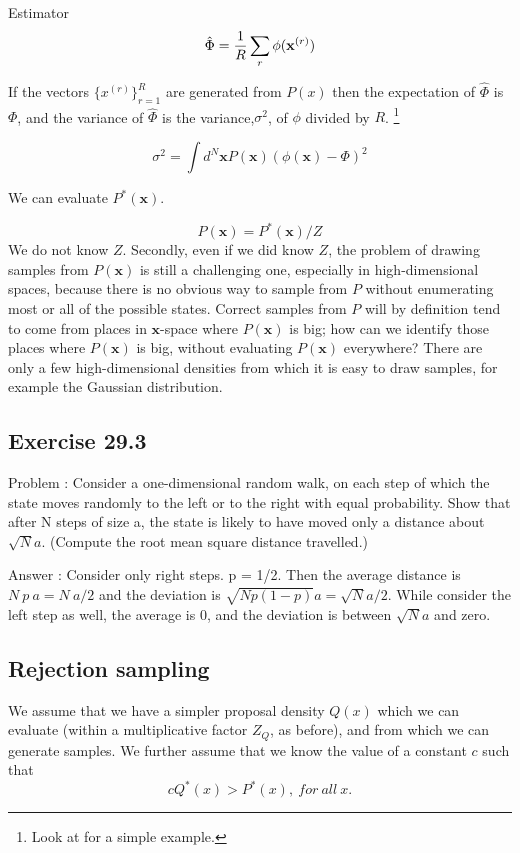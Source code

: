 \documentclass[a4paper,11pt]{article}
\newcommand{\vect}[1]{\boldsymbol{\mathbf{#1}}}
\numberwithin{equation}{section}
\begin{document}
{Estimator
$$
\hat \Phi = {1 \over R} \sum_r \phi(\vect x^{(r)})
$$

If the vectors $\{x^{(r)}\}^R_{r=1}$ are generated from $P(x)$ then the expectation of $\hat \Phi$ is $\Phi$, and the variance of $\hat \Phi$ is the variance,$\sigma^2$, of $\phi$ divided by $R$. \footnote{Look at \href{https://github.com/physhik/Study-of-David-Mackay-s-book-/blob/master/PopulationAndSampling.pdf}{\vect{this}} for a simple example.}

$$
\sigma^2 = \int d^N \vect x P(\vect x) (\phi(\vect x) - \Phi)^2
$$

We can evaluate $P^*(\vect x)$.

$$
P(\vect x)=P^*(\vect x)/Z
$$
We do not know $Z$. Secondly, even if we did know $Z$, the problem of drawing samples
from $P(\vect x)$ is still a challenging one, especially in high-dimensional spaces,
because there is no obvious way to sample from $P$ without enumerating most
or all of the possible states. Correct samples from $P$ will by definition tend
to come from places in $\vect x$-space where $P(\vect x)$ is big; how can we identify those
places where $P(\vect x)$ is big, without evaluating $P(\vect x)$ everywhere? There are only
a few high-dimensional densities from which it is easy to draw samples, for
example the Gaussian distribution.


\subsection{Exercise 29.3}

Problem : Consider a one-dimensional random walk, on each step of
which the state moves randomly to the left or to the right with equal
probability. Show that after N steps of size a, the state is likely to have
moved only a distance about $\sqrt{N}a$. (Compute the root mean square
distance travelled.)

Answer : Consider only right steps. p = 1/2. Then the average distance is $N~p~a = N~a/2$ and the deviation is $\sqrt{Np(1-p)}a = \sqrt{N}a/2$. While consider the left step as well, the average is 0, and the deviation is between $\sqrt{N}a$ and zero. 

\subsection{Rejection sampling}

We assume
that we have a simpler proposal density $Q(x)$ which we can evaluate (within a
multiplicative factor $Z_Q$, as before), and from which we can generate samples.
We further assume that we know the value of a constant $c$ such that
$$
c Q^*(x) > P^*(x),~for~all~x.
$$

}
\end{document}
